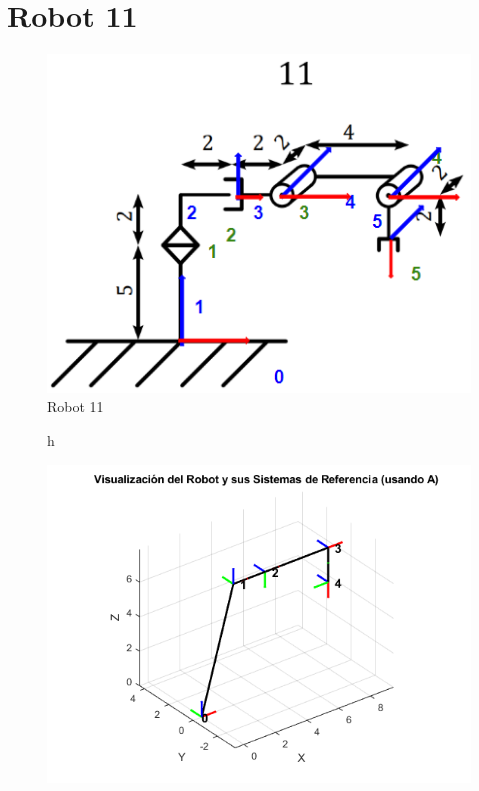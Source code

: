 \section{Robot 11}
\begin{figure}[h]
	\centering
	{%
	\includegraphics[width=0.7\linewidth]{img/Diagrama11}
	\caption{Robot 11}
	\label{fig:diagrama11}
	}
\end{figure}
\begin{figure}{h}
	\centering
	{%
	\includegraphics[width=0.7\linewidth]{img/MatLab11}
	\caption{}
	\label{fig:matlab11}
	}
\end{figure}
